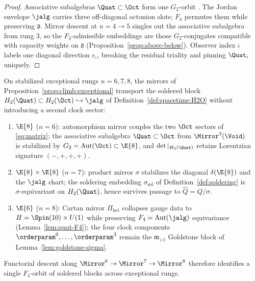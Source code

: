 \begin{proof}
Associative subalgebras $\Quat\subset\Oct$ form one $G_2$-orbit
\cite{SpringerVeldkamp2000}. The Jordan envelope $\jalg$ carries three
off-diagonal octonion slots; $F_4$ permutes them while preserving
$\mathfrak{d}$. Mirror descent at $n=4\to5$ singles out the associative
subalgebra from rung $3$, so the $F_4$-admissible embeddings are those
$G_2$-conjugates compatible with capacity weights on $\mathfrak{d}$
(Proposition~\ref{prop:above-below}). Observer index $\iota$ labels one
diagonal direction $e_\iota$, breaking the residual triality and pinning
$\Quat_\iota$ uniquely.
\end{proof}

\begin{proposition}
\label{prop:soldering-transport}
On stabilized exceptional rungs $n=6,7,8$, the mirrors of
Proposition~\ref{prop:climb:exceptional} transport the soldered block
$H_2(\Quat)\subset H_2(\Oct)\hookrightarrow\jalg$ of
Definition~\ref{def:spacetime:H2O} without introducing a second clock sector:
\begin{enumerate}[label=(\roman*),leftmargin=*]
  \item $\E{8}$ ($n=6$): automorphism mirror couples the two $\Oct$ sectors of
    \eqref{eq:matrix}; the associative subalgebra $\Quat\subset\Oct$ from
    $\Mirror^3(\Void)$ is stabilized by $G_2=\mathrm{Aut}(\Oct)\subset\E{8}$,
    and $\det|_{H_2(\Quat)}$ retains Lorentzian signature $(-,+,+,+)$.
  \item $\E{8}\times\E{8}$ ($n=7$): product mirror $\sigma$ stabilizes the
    diagonal $\delta(\E{8})$ and the $\jalg$ chart; the soldering embedding
    $\sigma_{\mathrm{sol}}$ of Definition~\ref{def:soldering} is
    $\sigma$-equivariant on $H_2(\Quat)$, hence survives passage to
    $\hat Q=Q/\sigma$.
  \item $\E{6}$ ($n=8$): Cartan mirror $\Pi_{\mathrm{het}}$ collapses gauge data
    to $H=\Spin(10)\times U(1)$ while preserving $F_4=\mathrm{Aut}(\jalg)$
    equivariance (Lemma~\ref{lem:quat-F4}); the four clock components
    $\orderparam^0,\ldots,\orderparam^3$ remain the $\mathfrak{m}_{+1}$
    Goldstone block of Lemma~\ref{lem:goldstone-sigma}.
\end{enumerate}
Functorial descent along $\Mirror^6\to\Mirror^7\to\Mirror^8$ therefore
identifies a single $F_4$-orbit of soldered blocks across exceptional rungs.
\end{proposition}

